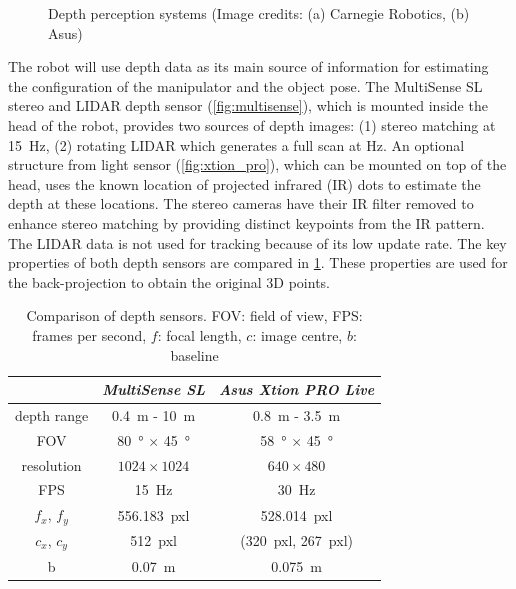 \begin{figure}
\begin{minipage}{0.5\textwidth}
\caption[Depth sensors]{Depth perception systems (Image credits: (a) Carnegie Robotics, (b) Asus)}
\label{fig:depth_sensors}
\end{minipage}
\end{figure}

The robot will use depth data as its main source of information for estimating the configuration of the manipulator and the object pose. The MultiSense SL stereo and LIDAR depth sensor (\cref{fig:multisense}), which is mounted inside the head of the robot, provides two sources of depth images: (1) stereo matching at \SI{15}{\hertz}, (2) rotating LIDAR which generates a full scan at  \si{\hertz}. An optional structure from light sensor (\cref{fig:xtion_pro}), which can be mounted on top of the head, uses the known location of projected infrared (IR) dots to estimate the depth at these locations. The stereo cameras have their IR filter removed to enhance stereo matching by providing distinct keypoints from the IR pattern. The LIDAR data is not used for tracking because of its low update rate.
The key properties of both depth sensors are compared in \cref{tab:depth_sensor_comparison}. These properties are used for the back-projection to obtain the original 3D points.

\begin{table}
\captionsetup{width=0.7\textwidth}
\centering
\begin{tabular}{|c||c|c|}
\hline
 & \textit{MultiSense SL} & \textit{Asus Xtion PRO Live} \\
\hline
\hline
depth range & \SI{0.4}{\meter} - \SI{10}{\meter} & \SI{0.8}{\meter} - \SI{3.5}{\meter} \\
\hline
FOV & \SI{80}{\degree} $\times$ \SI{45}{\degree} & \SI{58}{\degree} $\times$ \SI{45}{\degree} \\
\hline
resolution & $1024 \times 1024$ & $640 \times 480$ \\
\hline
FPS & \SI{15}{\hertz} & \SI{30}{\hertz} \\
\hline
$f_x$, $f_y$ & \SI{556.183}{pxl} & \SI{528.014}{pxl} \\
\hline
$c_x$, $c_y$ & \SI{512}{pxl} & (\SI{320}{pxl}, \SI{267}{pxl}) \\
\hline
b & \SI{0.07}{\meter} & \SI{0.075}{\meter} \\
\hline
\end{tabular}
\caption[Comparison of depth sensors]{Comparison of depth sensors. FOV: field of view, FPS: frames per second, $f$: focal length, $c$: image centre, $b$: baseline}
\label{tab:depth_sensor_comparison}
\end{table}


